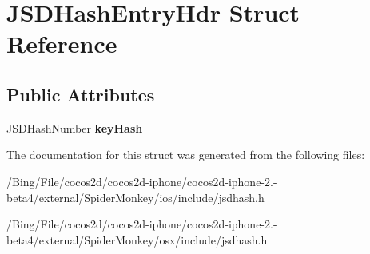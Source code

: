 \hypertarget{struct_j_s_d_hash_entry_hdr}{\section{J\-S\-D\-Hash\-Entry\-Hdr Struct Reference}
\label{struct_j_s_d_hash_entry_hdr}
}
\subsection*{Public Attributes}
\begin{DoxyCompactItemize}
\item 
\hypertarget{struct_j_s_d_hash_entry_hdr_a14b7a078248cd7ead43b6fc9c391bfc3}{J\-S\-D\-Hash\-Number {\bfseries key\-Hash}}\label{struct_j_s_d_hash_entry_hdr_a14b7a078248cd7ead43b6fc9c391bfc3}

\end{DoxyCompactItemize}


The documentation for this struct was generated from the following files\-:\begin{DoxyCompactItemize}
\item 
/\-Bing/\-File/cocos2d/cocos2d-\/iphone/cocos2d-\/iphone-\/2.-\/beta4/external/\-Spider\-Monkey/ios/include/jsdhash.\-h\item 
/\-Bing/\-File/cocos2d/cocos2d-\/iphone/cocos2d-\/iphone-\/2.-\/beta4/external/\-Spider\-Monkey/osx/include/jsdhash.\-h\end{DoxyCompactItemize}
